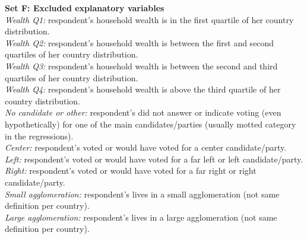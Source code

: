 \documentclass{article}
\begin{document}
\noindent \textbf{Set F: Excluded explanatory variables}\\
\textit{Wealth Q1:} respondent's household wealth is in the first quartile of her country distribution.\\
\textit{Wealth Q2:} respondent's household wealth is between the first and second quartiles of her country distribution.\\
\textit{Wealth Q3:} respondent's household wealth is between the second and third quartiles of her country distribution.\\
\textit{Wealth Q4:} respondent's household wealth is above the third quartile of her country distribution.\\
\textit{No candidate or other:} respondent's did not answer or indicate voting (even hypothetically) for one of the main candidates/parties (usually motted category in the regressions).\\
\textit{Center:} respondent's voted or would have voted for a center candidate/party.\\
\textit{Left:} respondent's voted or would have voted for a far left or left candidate/party.\\
\textit{Right:} respondent's voted or would have voted for a far right or right candidate/party.\\
\textit{Small agglomeration:} respondent's lives in a small agglomeration (not same definition per country).\\
\textit{Large agglomeration:} respondent's lives in a large agglomeration (not same definition per country).\\



\end{document}
